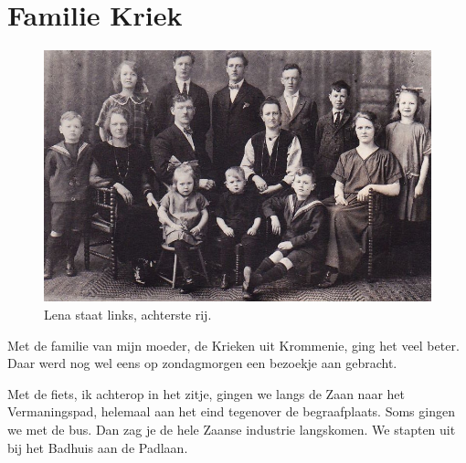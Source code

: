 \documentclass[10pt,twoside, openright]{memoir}
\begin{document}






\chapter{Familie Kriek} %
\label{cha:familie_kriek}



\begin{figure}
\includegraphics[width=\textwidth]{img/ch3/familie}
\caption*{\footnotesize Lena staat links, achterste rij.}
\end{figure}

Met de familie van mijn moeder, de Krieken uit Krommenie, ging het veel beter. Daar werd nog wel eens op zondagmorgen een bezoekje aan gebracht.   

Met de fiets, ik achterop in het zitje, gingen we langs de Zaan naar het Vermaningspad, helemaal aan het eind tegenover de begraafplaats. Soms gingen we met de bus. Dan zag je de hele Zaanse industrie langskomen. We stapten uit bij het Badhuis aan de Padlaan. 
\end{document}
